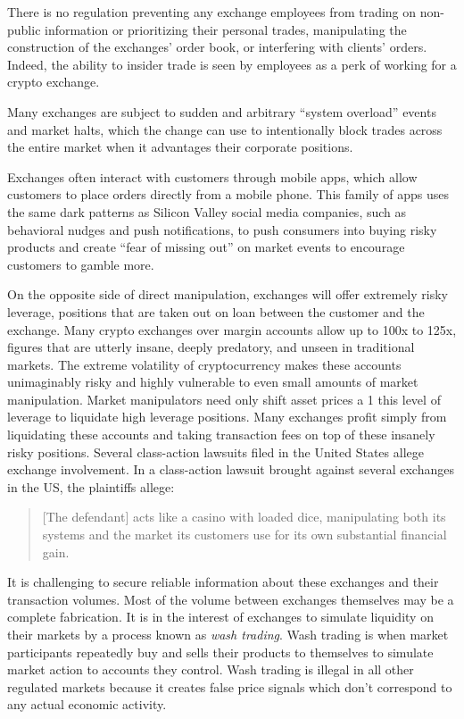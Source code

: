 There is no regulation preventing any exchange employees from trading on
non-public information or prioritizing their personal trades, manipulating the
construction of the exchanges' order book, or interfering with clients' orders.
Indeed, the ability to insider trade is seen by employees as a perk of working
for a crypto exchange.

Many exchanges are subject to sudden and arbitrary ``system overload'' events and
market halts, which the change can use to intentionally block trades across the
entire market when it advantages their corporate positions.
\cite{ostroff_binance_2021}

Exchanges often interact with customers through mobile apps, which allow
customers to place orders directly from a mobile phone. This family of apps uses
the same dark patterns as Silicon Valley social media companies, such as
behavioral nudges and push notifications, to push consumers into buying risky
products and create ``fear of missing out'' on market events to encourage
customers to gamble more.


On the opposite side of direct manipulation, exchanges will offer extremely
risky leverage, positions that are taken out on loan between the customer and
the exchange. Many crypto exchanges over margin accounts allow up to 100x to
125x, figures that are utterly insane, deeply predatory, and unseen in
traditional markets. The extreme volatility of cryptocurrency makes these
accounts unimaginably risky and highly vulnerable to even small amounts of
market manipulation. Market manipulators need only shift asset prices a 1%
this level of leverage to liquidate high leverage positions. Many exchanges
profit simply from liquidating these accounts and taking transaction fees on top
of these insanely risky positions. Several class-action lawsuits filed in the
United States allege exchange involvement. In a class-action lawsuit brought
against several exchanges in the US, the plaintiffs allege:

\begin{quote}
{[}The defendant{]} acts like a casino with loaded dice, manipulating
both its systems and the market its customers use for its own
substantial financial gain.
\end{quote}

It is challenging to secure reliable information about these exchanges and their
transaction volumes. Most of the volume between exchanges themselves may be a
complete fabrication. It is in the interest of exchanges to simulate liquidity
on their markets by a process known as \textit{wash trading}. Wash trading is when
market participants repeatedly buy and sells their products to themselves to
simulate market action to accounts they control. Wash trading is illegal in all
other regulated markets because it creates false price signals which don't
correspond to any actual economic activity.

